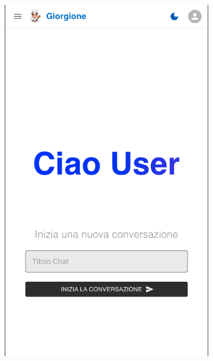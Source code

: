 \begin{figure}[h!]
    \centering
    \begin{subfigure}{0.3\textwidth}
        \centering
        \includegraphics[width=\textwidth]{./img/layoutResponsive1White.png}
    \end{subfigure}
    \hspace{0.05\textwidth}
    \begin{subfigure}{0.3\textwidth}
        \centering

\end{subfigure}
\end{figure}
